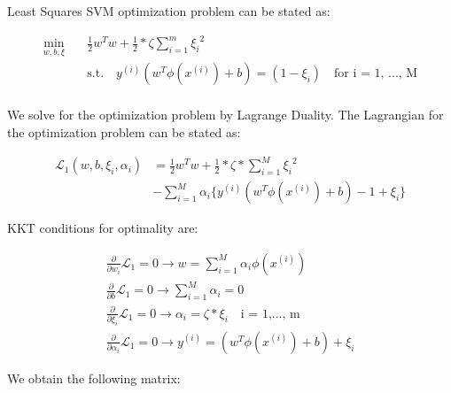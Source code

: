 \documentclass[11pt]{article}
\begin{document}
Least Squares SVM optimization problem can be stated as: 

\begin{equation}
\begin{split}
\min_{w, b, \xi} & \quad \frac{1}{2} w^T w + \frac{1}{2} * \zeta \sum_{i= 1}^{m} {\xi_{i}}^{2}\\
&\quad \textrm{s.t.}  \quad y^{(i)}(w^T \phi (x^{(i)}) +  b) = (1 - \xi_{i}) \quad \textrm{for i = 1, ..., M}\\
\end{split}
\end{equation}

We solve for the optimization problem by Lagrange Duality. The Lagrangian for the optimization problem can be stated as:

\begin{equation}
\begin{split}
\mathcal{L}_{1}(w , b, \xi_{i}, \alpha_{i}) &= \frac{1}{2} w^T w + \frac{1}{2} * \zeta * \sum_{i= 1}^{M} {\xi_{i}}^{2} \\
&- \sum_{i=1}^{M} \alpha_{i} \{y^{(i)}(w^{T} \phi(x^{(i)}) + b) -1 + \xi_{i} \} 
\end{split}
\end{equation}

KKT conditions for optimality are:

\begin{equation}
\label{eq:t}
\begin{gathered}
\frac{\partial}{\partial w_{i}} \mathcal{L}_{1} = 0 \longrightarrow w = \sum_{i=1}^{M} \alpha_{i} \phi(x^{(i)}) \\
\frac{\partial}{\partial b} \mathcal{L}_{1} = 0 \longrightarrow \sum_{i=1}^{M} \alpha_{i} = 0 \\
\frac{\partial}{\partial \xi_{i}} \mathcal{L}_{1} = 0 \longrightarrow \alpha_{i} = \zeta * \xi_{i} \quad \text{i = 1,..., m} \\
\frac{\partial}{\partial \alpha_{i}} \mathcal{L}_{1} = 0 \longrightarrow y^{(i)} = (w^{T} \phi(x^{(i)}) + b) + \xi_{i}
\end{gathered}
\end{equation}

We obtain the following matrix:
\end{document}
